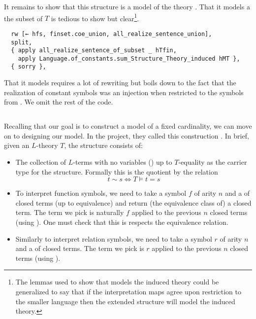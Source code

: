 It remains to show that this structure is a model of the theory .
That it models a the subset of $T$ is tedious to show but clear\footnote{
  The lemmas used to show that  models the induced
  theory could be generalized to say that if the
  interpretation maps agree upon restriction to the smaller language
  then the extended structure will model the induced theory. }.

\begin{lstlisting}
  rw [← hfs, finset.coe_union, all_realize_sentence_union],
  split,
  { apply all_realize_sentence_of_subset _ hTfin,
    apply Language.of_constants.sum_Structure_Theory_induced hMT },
  { sorry }, \end{lstlisting}

That it models  requires a lot of rewriting but
boils down to the fact that the realization of constant symbols
was an injection when restricted to the symbols from .
We omit the rest of the code.

\subsection{}
Recalling that our goal is to construct a model of a fixed cardinality,
we can move on to designing our model.
In the  project, they called this construction .
In brief, given an $L$-theory $T$, the structure consists of:
\begin{itemize}
  \item The collection of $L$-terms with no variables ()
        up to $T$-equality as the
        carrier type for the structure.
        Formally this is the quotient by the relation
        \[ t \sim s \iff T \vDash t = s \]
  \item To interpret function symbols, we need to take a
        symbol $f$ of arity $n$ and a  of closed terms
        (up to equivalence) and return (the equivalence class of) a closed term.
        The term we pick is naturally $f$
        applied to the previous $n$ closed terms (using ).
        One must check that this is respects the equivalence relation.
  \item Similarly to interpret relation symbols, we need to take a
        symbol $r$ of arity $n$ and a  of closed terms.
        The term we pick is $r$ applied to the previous $n$ closed terms
        (using ).
\end{itemize}

